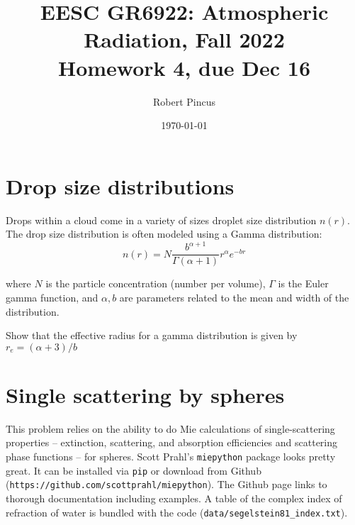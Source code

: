 \documentclass{article}
\title{EESC GR6922: Atmospheric Radiation, Fall 2022 \\ Homework 4, due Dec 16}
\author{Robert Pincus}
\date{\today}
\begin{document}
\maketitle
\section{Drop size distributions}

Drops within a cloud come in a variety of sizes droplet size distribution $n(r)$. The drop size distribution is often modeled using a Gamma distribution:
$$
n(r) = N\frac{b^{\alpha+1}}{\Gamma(\alpha+1)} r^{\alpha}e^{-br}
$$

where $N$  is the particle concentration (number per volume), $\Gamma$ is the Euler gamma function, and $\alpha, b$ are parameters related to the mean and width of the distribution. 

Show that the effective radius for a gamma distribution is given by $r_e = (\alpha+3)/b$

\section{Single scattering by spheres}

This problem relies on the ability to do Mie calculations of single-scattering properties -- extinction, scattering, and absorption efficiencies and  scattering phase functions -- for spheres. Scott Prahl's {\tt miepython} package looks pretty great. It can be installed via {\tt pip} or download from Github ({\tt https://github.com/scottprahl/miepython}). The Github page links to thorough documentation including examples. A table of the complex index of refraction of water is bundled with the code ({\tt data/segelstein81\_index.txt}). 
\end{document}
